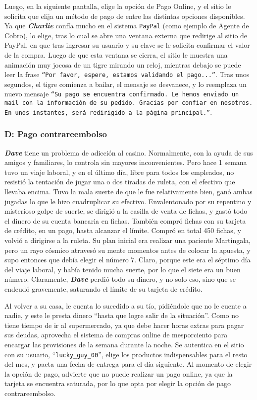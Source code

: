 Luego, en la siguiente pantalla, elige la opción de Pago Online, y el sitio le
solicita que elija un método de pago de entre las distintas opciones
disponibles. Ya que \textbf{\emph{Charlie}} confía mucho en el sistema
\texttt{PayPal} (como ejemplo de Agente de Cobro), lo elige, tras lo cual se
abre una ventana externa que redirige al sitio de PayPal, en que tras ingresar
su usuario y su clave se le solicita confirmar el valor de la compra. Luego de
que esta ventana se cierra, el sitio le muestra una animación muy jocosa de un
tigre mirando un reloj, mientras debajo se puede leer la frase \texttt{``Por
favor, espere, estamos validando el pago...''}. Tras unos segundos, el tigre
comienza a bailar, el mensaje se desvanece, y lo reemplaza un nuevo mensaje
\texttt{``Su pago se encuentra confirmado. Le hemos enviado un mail con la
información de su pedido. Gracias por confiar en nosotros. En unos instantes,
será redirigido a la página principal.''}.

\subsubsection{D: Pago contrareembolso}

\textbf{\emph{Dave}} tiene un problema de adicción al casino. Normalmente, con
la ayuda de sus amigos y familiares, lo controla sin mayores inconvenientes.
Pero hace 1 semana tuvo un viaje laboral, y en el último día, libre para todos
los empleados, no resistió la tentación de jugar una o dos tiradas de ruleta,
con el efectivo que llevaba encima. Tuvo la mala suerte de que le fue
relativamente bien, ganó ambas jugadas lo que le hizo cuadruplicar su
efectivo. Envalentonado por su repentino y misterioso golpe de suerte, se
dirigió a la casilla de venta de fichas, y gastó todo el dinero de su cuenta
bancaria en fichas. También compró fichas con su tarjeta de crédito, en un
pago, hasta alcanzar el límite. Compró en total 450 fichas, y volvió a
dirigirse a la ruleta. Su plan inicial era realizar una paciente Martingala,
pero un rayo cósmico atravesó su mente momentos antes de colocar la apuesta, y
supo entonces que debía elegir el número 7. Claro, porque este era el séptimo
día del viaje laboral, y había tenido mucha suerte, por lo que el siete era un
buen número. Claramente, \textbf{\emph{Dave}} perdió todo su dinero, y no solo
eso, sino que se endeudó gravemente, saturando el límite de su tarjeta de
crédito.

Al volver a su casa, le cuenta lo sucedido a su tío, pidiéndole que no le
cuente a nadie, y este le presta dinero ``hasta que logre salir de la
situación''. Como no tiene tiempo de ir al supermercado, ya que debe hacer
horas extras para pagar sus deudas, aprovecha el sistema de compras online de
mesporciento para encargar las provisiones de la semana durante la noche. Se
autentica en el sitio con su usuario, ``\texttt{lucky\_guy\_00}'', elige los
productos indispensables para el resto del mes, y pacta una fecha de entrega
para el día siguiente. Al momento de elegir la opción de pago, advierte que no
puede realizar un pago online, ya que la tarjeta se encuentra saturada, por lo
que opta por elegir la opción de pago contrareembolso.

